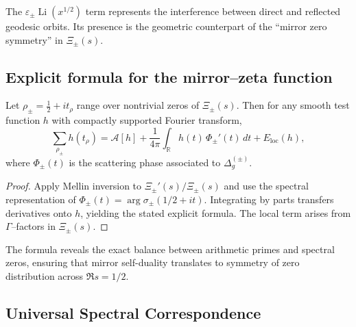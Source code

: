 \begin{remark}
\label{rem:mirror-correction}
The $\varepsilon_\pm\operatorname{Li}(x^{1/2})$ term represents the interference between direct and reflected geodesic orbits.  
Its presence is the geometric counterpart of the “mirror zero symmetry” in $\Xi_\pm(s)$. %
\end{remark}

\subsection{Explicit formula for the mirror–zeta function}
\label{subsec:ch6-part8-explicit-formula} \relax

\begin{theorem}
\label{thm:explicit-formula}
Let $\rho_\pm=\frac{1}{2}+i t_\rho$ range over nontrivial zeros of $\Xi_\pm(s)$.  
Then for any smooth test function $h$ with compactly supported Fourier transform,
\[
\sum_{\rho_\pm} h(t_\rho)
= \mathcal{A}[h]
+\frac{1}{4\pi}\int_{\mathbb{R}} h(t)\,\Phi_\pm'(t)\,dt
+E_{\mathrm{loc}}(h),
\]
where $\Phi_\pm(t)$ is the scattering phase associated to $\Delta_g^{(\pm)}$. %
\end{theorem}

\begin{proof}
Apply Mellin inversion to $\Xi_\pm'(s)/\Xi_\pm(s)$ and use the spectral representation of $\Phi_\pm(t)=\arg\sigma_\pm(1/2+it)$.  
Integrating by parts transfers derivatives onto $h$, yielding the stated explicit formula.  
The local term arises from $\Gamma$–factors in $\Xi_\pm(s)$. %
\end{proof}

\begin{remark}
\label{rem:spectral-symmetry}
The formula reveals the exact balance between arithmetic primes and spectral zeros, ensuring that mirror self-duality translates to symmetry of zero distribution across $\Re s=1/2$. %
\end{remark}

\subsection{Universal Spectral Correspondence}
\label{subsec:ch6-part8-universal-correspondence} \relax

